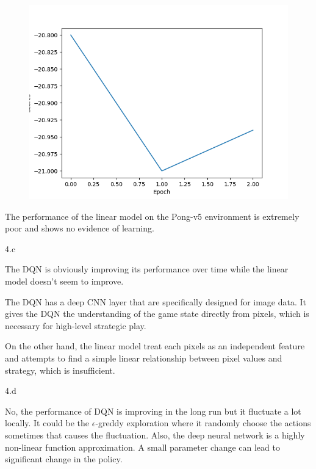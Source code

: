 \begin{answer}
  \begin{figure}[H]
  \centering
    \includegraphics[width=.5\linewidth]{images/q4_linear.png}
  \end{figure}
  The performance of the linear model on the Pong-v5 environment is extremely poor and shows
  no evidence of learning.
\end{answer}
\clearpage

\LARGE
4.c
\normalsize

\begin{answer}
  The DQN is obviously improving its performance over time while the linear model doesn't seem
  to improve.

  The DQN has a deep CNN layer that are specifically designed for image data. It gives the DQN
  the understanding of the game state directly from pixels, which is necessary for high-level
  strategic play.

  On the other hand, the linear model treat each pixels as an independent feature and attempts
  to find a simple linear relationship between pixel values and strategy, which is insufficient.
\end{answer}
\clearpage

\LARGE
4.d
\normalsize

\begin{answer}
  No, the performance of DQN is improving in the long run but it fluctuate a lot locally.
  It could be the $\epsilon$-greddy exploration where it randomly choose the actions sometimes
  that causes the fluctuation. Also, the deep neural network is a highly non-linear function
  approximation. A small parameter change can lead to significant change in the policy.
\end{answer}
\clearpage



